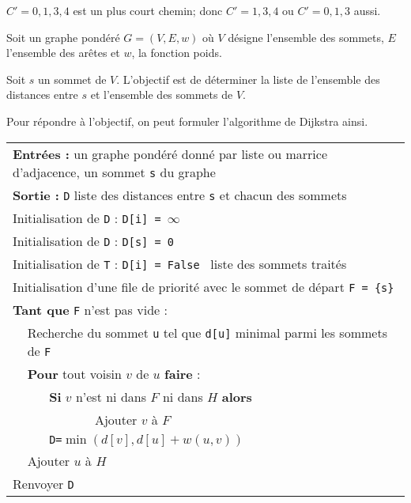 \begin{exemple}
$C' = 0, 1,3,4$ est un plus court chemin; donc $C' = 1,3,4$ ou $C' = 0, 1,3$ aussi. 
\end{exemple}

\begin{obj}
Soit un graphe pondéré $G=\left(V, E, w\right)$ où $V$ désigne l'ensemble des sommets, $E$ l'ensemble des arêtes et 
$w$, la fonction poids.

Soit $s$ un sommet de $V$. L'objectif est de déterminer la liste de l'ensemble des distances entre $s$ et l'ensemble des sommets de $V$.
\end{obj}


Pour répondre à l'objectif, on peut formuler l'algorithme de Dijkstra ainsi. 


\begin{center}
\begin{tabular}{|p{1cm}p{1cm}p{1cm}p{10cm}}
\multicolumn{4}{|p{15cm}}{\textbf{Entrées : }  un graphe pondéré donné par liste ou marrice d'adjacence, un sommet \texttt{s} du graphe}\\
\multicolumn{4}{|p{15cm}}{\textbf{Sortie : } \texttt{D} liste des distances entre \texttt{s} et chacun des sommets}\\
\multicolumn{4}{|p{15cm}}{Initialisation de \texttt{D} : \texttt{D[i] = }$\infty$ }\\
\multicolumn{4}{|p{15cm}}{Initialisation de \texttt{D} : \texttt{D[s] = 0 }}\\
\multicolumn{4}{|p{15cm}}{Initialisation de \texttt{T} : \texttt{D[i] = False } liste des sommets traités }\\
\multicolumn{4}{|p{15cm}}{Initialisation d'une file de priorité avec le sommet de départ \texttt{F = \{s\}}}\\
\multicolumn{4}{|p{15cm}}{\textbf{Tant que} \texttt{F} n'est pas vide :  }\\
& \multicolumn{3}{|p{15cm}}{Recherche du sommet \texttt{u} tel que \texttt{d[u]} minimal parmi les sommets de \texttt{F}}\\
& \multicolumn{3}{|p{15cm}}{\textbf{Pour} tout voisin $v$ de $u$ \textbf{faire} :}\\
&& \multicolumn{2}{|p{15cm}}{\textbf{Si} $v$ n'est ni dans $F$ ni dans $H$ \textbf{alors}}\\
&&& \multicolumn{1}{|p{15cm}}{Ajouter $v$ à $F$}\\
&& \multicolumn{2}{|p{15cm}}{\texttt{D=}$\min \left(d[v],d[u]+w(u,v)\right)$}\\
& \multicolumn{3}{|p{15cm}}{Ajouter $u$ à $H$}\\
\multicolumn{4}{|p{15cm}}{Renvoyer \texttt{D}}\\
\end{tabular}
\end{center}

